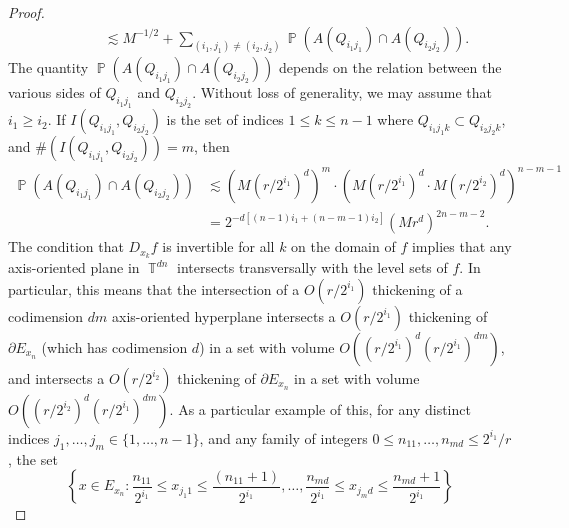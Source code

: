 \documentclass[dvipsnames,letterpaper,12pt]{article}
\numberwithin{equation}{section}
\DeclareMathOperator{\TT}{\mathbb{T}}
\numberwithin{theorem}{section}
\DeclareMathOperator{\PP}{\mathbb{P}}
\begin{document}
\begin{proof}
\begin{equation}
\begin{split}
        &\quad\quad\quad \lesssim M^{-1/2} + \sum_{(i_1,j_1) \neq (i_2,j_2)} \PP(A(Q_{i_1j_1}) \cap A(Q_{i_2j_2})).
    \end{split}
    \end{equation}
    The quantity $\PP(A(Q_{i_1j_1}) \cap A(Q_{i_2j_2}))$ depends on the relation between the various sides of $Q_{i_1j_1}$ and $Q_{i_2j_2}$. Without loss of generality, we may assume that $i_1 \geq i_2$. If $I(Q_{i_1j_1},Q_{i_2j_2})$ is the set of indices $1 \leq k \leq n-1$ where $Q_{i_1j_1k} \subset Q_{i_2j_2k}$, and $\#(I(Q_{i_1j_1}, Q_{i_2j_2})) = m$, then
    \begin{equation} \label{equationVOIJVIJISJCISJCIEWJRIJI43234}
    \begin{split}
        \PP(A(Q_{i_1j_1}) \cap A(Q_{i_2j_2})) &\lesssim (M(r/2^{i_1})^d)^m \cdot (M(r/2^{i_1})^d \cdot M(r/2^{i_2})^d)^{n-m-1}\\
        &= 2^{-d[(n-1)i_1 + (n-m-1)i_2]} (Mr^d)^{2n - m-2}.
    \end{split}
    \end{equation}
    The condition that $D_{x_k} f$ is invertible for all $k$ on the domain of $f$ implies that any axis-oriented plane in $\TT^{dn}$ intersects transversally with the level sets of $f$. In particular, this means that the intersection of a $O(r/2^{i_1})$ thickening of a codimension $dm$ axis-oriented hyperplane intersects a $O(r/2^{i_1})$ thickening of $\partial E_{x_n}$ (which has codimension $d$) in a set with volume $O \left( (r/2^{i_1})^d (r/2^{i_1})^{dm} \right)$, and intersects a $O(r/2^{i_2})$ thickening of $\partial E_{x_n}$ in a set with volume $O \left( (r/2^{i_2})^d (r/2^{i_1})^{dm} \right)$. As a particular example of this, for any distinct indices $j_1,\dots,j_m \in \{ 1,\dots, n-1 \}$, and any family of integers $0 \leq n_{11},\dots,n_{md} \leq 2^{i_1}/r$, the set
    \begin{equation}
        \left\{ x \in E_{x_n} : \frac{n_{11}}{2^{i_1}} \leq x_{j_1 1} \leq \frac{(n_{11} + 1)}{2^{i_1}}, \dots, \frac{n_{md}}{2^{i_1}} \leq x_{j_m d} \leq \frac{n_{md} + 1}{2^{i_1}} \right\}

\end{equation}
\end{proof}
\end{document}
